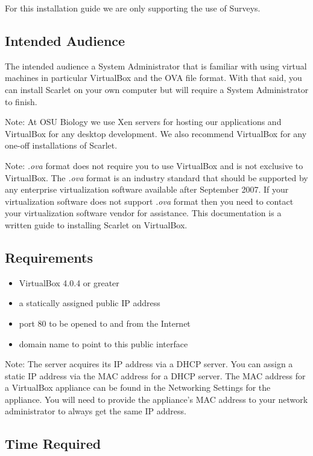 \documentclass[pdftex,11pt,letterpaper]{article}
\begin{document}
For this installation guide we are only supporting the use of Surveys.

\subsection{Intended Audience}

The intended audience a System Administrator that is familiar with using virtual machines in particular VirtualBox and the OVA file format.  With that said, you can install Scarlet on your own computer but will require a System Administrator to finish.

Note:
At OSU Biology we use Xen servers for hosting our applications and VirtualBox for any desktop development.  We also recommend VirtualBox for any one-off installations of Scarlet.

Note:
\textit{.ova} format does not require you to use VirtualBox and is not exclusive to VirtualBox.  The \textit{.ova} format is an industry standard that should be supported by any enterprise virtualization software available after September 2007.  If your virtualization software does not support \textit{.ova} format then you need to contact your virtualization software vendor for assistance.  This documentation is a written guide to installing Scarlet on VirtualBox.

\subsection{Requirements}

\begin{itemize}
\item VirtualBox 4.0.4 or greater
\item a statically assigned public IP address 
\item port 80 to be opened to and from the Internet
\item domain name to point to this public interface
\end{itemize}

Note:
The server acquires its IP address via a DHCP server.  You can assign a static IP address via the MAC address for a DHCP server.  The MAC address for a VirtualBox appliance can be found in the Networking Settings for the appliance. You will need to provide the appliance's MAC address to your network administrator to always get the same IP address.

\subsection{Time Required}
\end{document}
